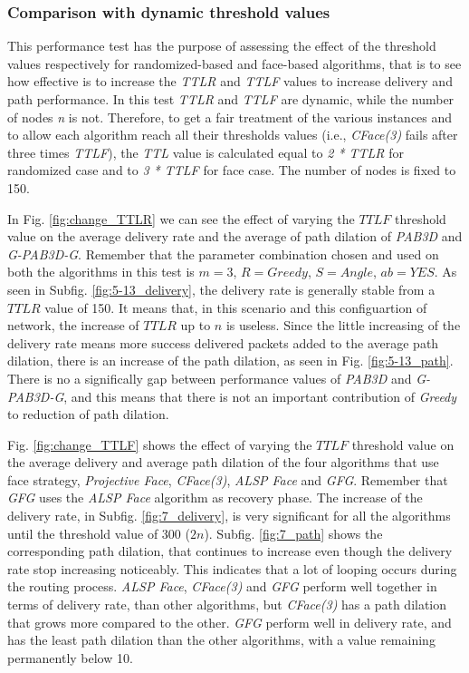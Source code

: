 \documentclass[journal,comsoc]{IEEEtran}
\begin{document}
\subsubsection{Comparison with dynamic threshold values}
This performance test has the purpose of assessing the effect of the threshold values respectively for randomized-based and face-based algorithms, that is to see how effective is to increase the \emph{TTLR} and \emph{TTLF} values to increase delivery and path performance. In this test \emph{TTLR} and \emph{TTLF} are dynamic, while the number of nodes \emph{n} is not. Therefore, to get a fair treatment of the various instances and to allow each algorithm reach all their thresholds values (i.e., \emph{CFace(3)} fails after three times \emph{TTLF}), the \emph{TTL} value is calculated equal to \emph{2 * TTLR} for randomized case and to \emph{3 * TTLF} for face case. The number of nodes is fixed to 150.
\par In Fig. \ref{fig:change_TTLR} we can see the effect of varying the \(TTLF\) threshold value on the average delivery rate and the average of path dilation of \emph{PAB3D} and \emph{G-PAB3D-G}. Remember that the parameter combination chosen and used on both the algorithms in this test is \(m=3\), \(R=Greedy\), \(S=Angle\), \(ab=YES\). As seen in Subfig. \ref{fig:5-13_delivery}, the delivery rate is generally stable from a \(TTLR\) value of 150. It means that, in this scenario and this configuartion of network, the increase of \(TTLR\) up to \(n\) is useless. Since the little increasing of the delivery rate means more success delivered packets added to the average path dilation, there is an increase of the path dilation, as seen in Fig. \ref{fig:5-13_path}. There is no a significally gap between performance values of \emph{PAB3D} and \emph{G-PAB3D-G}, and this means that there is not an important contribution of \emph{Greedy} to reduction of path dilation.
\par Fig. \ref{fig:change_TTLF} shows the effect of varying the \(TTLF\) threshold value on the average delivery and average path dilation of the four algorithms that use face strategy, \emph{Projective Face}, \emph{CFace(3)}, \emph{ALSP Face} and \emph{GFG}. Remember that \emph{GFG} uses the \emph{ALSP Face} algorithm as recovery phase. The increase of the delivery rate, in Subfig. \ref{fig:7_delivery}, is very significant
for all the algorithms until the threshold value of 300 (\(2n\)). Subfig. \ref{fig:7_path} shows the corresponding path dilation, that continues to increase even though the delivery rate stop increasing noticeably. This indicates that a lot of looping occurs during the routing process. \emph{ALSP Face}, \emph{CFace(3)} and \emph{GFG} perform well together in
terms of delivery rate, than other algorithms, but \emph{CFace(3)} has a path dilation that
grows more compared to the other. \emph{GFG} perform well in delivery rate, and has the least path dilation than the other algorithms, with a value remaining permanently below 10.
\end{document}
